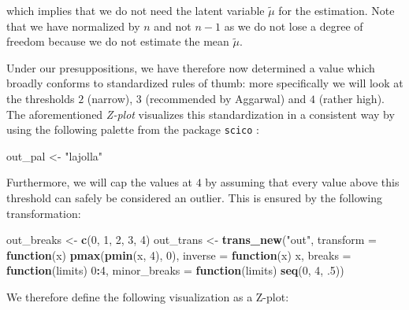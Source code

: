 \documentclass[]{report}
\newenvironment{Shaded}{\begin{snugshade}}{\end{snugshade}}
\newcommand{\ControlFlowTok}[1]{\textcolor[rgb]{0.13,0.29,0.53}{\textbf{#1}}}
\newcommand{\DataTypeTok}[1]{\textcolor[rgb]{0.13,0.29,0.53}{#1}}
\newcommand{\DecValTok}[1]{\textcolor[rgb]{0.00,0.00,0.81}{#1}}
\newcommand{\FloatTok}[1]{\textcolor[rgb]{0.00,0.00,0.81}{#1}}
\newcommand{\KeywordTok}[1]{\textcolor[rgb]{0.13,0.29,0.53}{\textbf{#1}}}
\newcommand{\NormalTok}[1]{#1}
\newcommand{\OperatorTok}[1]{\textcolor[rgb]{0.81,0.36,0.00}{\textbf{#1}}}
\newcommand{\StringTok}[1]{\textcolor[rgb]{0.31,0.60,0.02}{#1}}
\theoremstyle{definition}
\theoremstyle{definition}
\theoremstyle{definition}
\theoremstyle{remark}
\begin{document}
which implies that we do not need the latent variable \(\tilde{\mu}\)
for the estimation. Note that we have normalized by \(n\) and not
\(n-1\) as we do not lose a degree of freedom because we do not estimate
the mean \(\tilde{\mu}\).

Under our presuppositions, we have therefore now determined a value
which broadly conforms to standardized rules of thumb: more specifically
we will look at the thresholds \(2\) (narrow), \(3\) (recommended by
Aggarwal) and \(4\) (rather high). The aforementioned \emph{Z-plot}
visualizes this standardization in a consistent way by using the
following palette from the package \texttt{scico} \citep{scico}:

\begin{Shaded}
\begin{Highlighting}[]
\NormalTok{out_pal <-}\StringTok{ "lajolla"}
\end{Highlighting}
\end{Shaded}

Furthermore, we will cap the values at \(4\) by assuming that every
value above this threshold can safely be considered an outlier. This is
ensured by the following transformation:

\begin{Shaded}
\begin{Highlighting}[]
\NormalTok{out_breaks <-}\StringTok{ }\KeywordTok{c}\NormalTok{(}\DecValTok{0}\NormalTok{, }\DecValTok{1}\NormalTok{, }\DecValTok{2}\NormalTok{, }\DecValTok{3}\NormalTok{, }\DecValTok{4}\NormalTok{)}
\NormalTok{out_trans <-}\StringTok{ }\KeywordTok{trans_new}\NormalTok{(}\StringTok{"out"}\NormalTok{, }\DataTypeTok{transform =} \ControlFlowTok{function}\NormalTok{(x) }\KeywordTok{pmax}\NormalTok{(}\KeywordTok{pmin}\NormalTok{(x, }\DecValTok{4}\NormalTok{), }\DecValTok{0}\NormalTok{),}
                       \DataTypeTok{inverse =} \ControlFlowTok{function}\NormalTok{(x) x,}
                       \DataTypeTok{breaks =} \ControlFlowTok{function}\NormalTok{(limits) }\DecValTok{0}\OperatorTok{:}\DecValTok{4}\NormalTok{,}
                       \DataTypeTok{minor_breaks =} \ControlFlowTok{function}\NormalTok{(limits) }\KeywordTok{seq}\NormalTok{(}\DecValTok{0}\NormalTok{, }\DecValTok{4}\NormalTok{, }\FloatTok{.5}\NormalTok{))}
\end{Highlighting}
\end{Shaded}

We therefore define the following visualization as a Z-plot:
\end{document}
